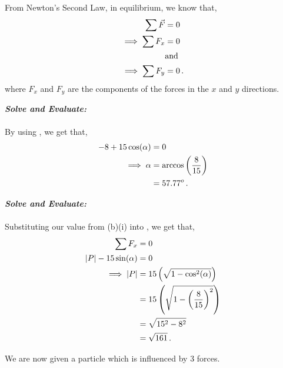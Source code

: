 \begin{subquestions}
\begin{subsubquestions}
From Newton's Second Law, in equilibrium, we know that,
\begin{align}
	\sum \vec{F} & = 0 \nonumber \\
	\implies \sum F_x & = 0 \label{2010:q6:ForceX2} \\
	& \text{and} \nonumber \\
	\implies \sum F_y & = 0 \label{2010:q6:ForceY2} \,.
\end{align}
where $F_x$ and $F_y$ are the components of the forces in the $x$ and $y$ directions.
	



\textbf{\textit{Solve and Evaluate:}} \\ \\
By using , we get that,
\begin{align}
	-8 + 15\cos(\alpha) & = 0 \nonumber \\
	\implies \alpha & = \arccos\left(\frac{8}{15}\right) \nonumber \\
	                & = 57.77^o \,. 
\end{align}


\subsubquestion

\textbf{\textit{Solve and Evaluate:}} \\ \\
Substituting our value from (b)(i) into , we get that,
\begin{align}
	\sum F_x & = 0 \nonumber \\
	|P| - 15\sin(\alpha) & = 0 \nonumber \\ 
	\implies |P| & = 15\left(\sqrt{1-\cos^2(\alpha)} \right) \nonumber \\
	             & = 15\left(\sqrt{1-\left(\frac{8}{15}\right)^2} \right) \nonumber \\
	             & = \sqrt{15^2-8^2} \nonumber \\
	             & = \sqrt{161} \,.
\end{align}
	
\end{subsubquestions}


\subquestion
We are now given a particle which is influenced by 3 forces.
\begin{subsubquestions}


\end{subsubquestions}
\end{subquestions}
